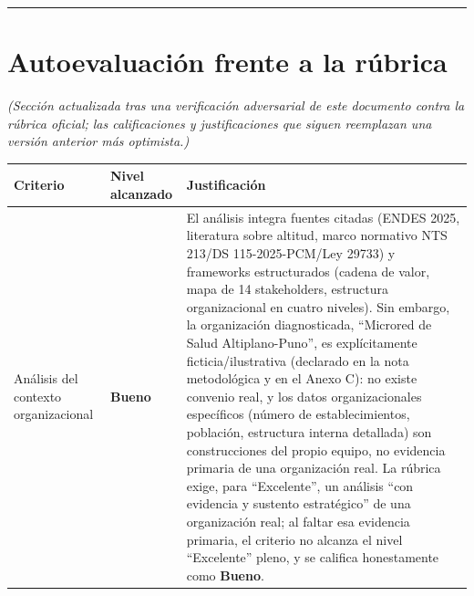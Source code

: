 \documentclass[11pt,a4paper]{article}
\begin{document}
\begin{center}\rule{0.5\linewidth}{0.5pt}\end{center}

\section{Autoevaluación frente a la rúbrica}\label{autoevaluaciuxf3n-frente-a-la-ruxfabrica}

\emph{(Sección actualizada tras una verificación adversarial de este documento contra la rúbrica oficial; las calificaciones y justificaciones que siguen reemplazan una versión anterior más optimista.)}

{\small
\begin{longtable}[]{@{}
  >{\raggedright\arraybackslash}p{}
  >{\raggedright\arraybackslash}p{}
  >{\raggedright\arraybackslash}p{}@{}}
\toprule\noalign{}
\begin{minipage}[b]{\linewidth}\raggedright
Criterio
\end{minipage} & \begin{minipage}[b]{\linewidth}\raggedright
Nivel alcanzado
\end{minipage} & \begin{minipage}[b]{\linewidth}\raggedright
Justificación
\end{minipage} \\
\midrule\noalign{}
\endhead
\bottomrule\noalign{}
\endlastfoot
Análisis del contexto organizacional & \textbf{Bueno} & El análisis integra fuentes citadas (ENDES 2025, literatura sobre altitud, marco normativo NTS 213/DS 115-2025-PCM/Ley 29733) y frameworks estructurados (cadena de valor, mapa de 14 stakeholders, estructura organizacional en cuatro niveles). Sin embargo, la organización diagnosticada, ``Microred de Salud Altiplano-Puno'', es explícitamente ficticia/ilustrativa (declarado en la nota metodológica y en el Anexo C): no existe convenio real, y los datos organizacionales específicos (número de establecimientos, población, estructura interna detallada) son construcciones del propio equipo, no evidencia primaria de una organización real. La rúbrica exige, para ``Excelente'', un análisis ``con evidencia y sustento estratégico'' de una organización real; al faltar esa evidencia primaria, el criterio no alcanza el nivel ``Excelente'' pleno, y se califica honestamente como \textbf{Bueno}. \\

\end{longtable}}
\end{document}
